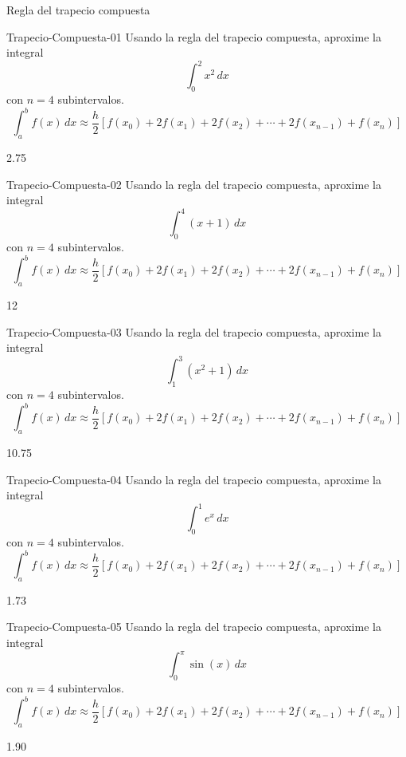 \documentclass[a4,11pt]{aleph-notas}
\begin{document}
\begin{quiz}{Regla del trapecio compuesta}
\begin{numerical}[tolerance=0.01]%
    {Trapecio-Compuesta-01}
    Usando la regla del trapecio compuesta, aproxime la integral
    \[
        \int_{0}^{2} x^2\,dx
    \]
    con \( n=4 \) subintervalos.
    \[
        \int_a^b f(x)\,dx \approx \frac{h}{2}\left[f(x_0)+2f(x_1)+2f(x_2)+\cdots+2f(x_{n-1})+f(x_n)\right]
    \]
    \item 2.75
\end{numerical}

\begin{numerical}[tolerance=0.01]%
    {Trapecio-Compuesta-02}
    Usando la regla del trapecio compuesta, aproxime la integral
    \[
        \int_{0}^{4} (x+1)\,dx
    \]
    con \( n=4 \) subintervalos.
    \[
        \int_a^b f(x)\,dx \approx \frac{h}{2}\left[f(x_0)+2f(x_1)+2f(x_2)+\cdots+2f(x_{n-1})+f(x_n)\right]
    \]
    \item 12
\end{numerical}

\begin{numerical}[tolerance=0.01]%
    {Trapecio-Compuesta-03}
    Usando la regla del trapecio compuesta, aproxime la integral
    \[
        \int_{1}^{3} (x^2+1)\,dx
    \]
    con \( n=4 \) subintervalos.
    \[
        \int_a^b f(x)\,dx \approx \frac{h}{2}\left[f(x_0)+2f(x_1)+2f(x_2)+\cdots+2f(x_{n-1})+f(x_n)\right]
    \]
    \item 10.75
\end{numerical}

\begin{numerical}[tolerance=0.01]%
    {Trapecio-Compuesta-04}
    Usando la regla del trapecio compuesta, aproxime la integral
    \[
        \int_{0}^{1} e^x\,dx
    \]
    con \( n=4 \) subintervalos.
    \[
        \int_a^b f(x)\,dx \approx \frac{h}{2}\left[f(x_0)+2f(x_1)+2f(x_2)+\cdots+2f(x_{n-1})+f(x_n)\right]
    \]
    \item 1.73
\end{numerical}

\begin{numerical}[tolerance=0.01]%
    {Trapecio-Compuesta-05}
    Usando la regla del trapecio compuesta, aproxime la integral
    \[
        \int_{0}^{\pi} \sin(x)\,dx
    \]
    con \( n=4 \) subintervalos.
    \[
        \int_a^b f(x)\,dx \approx \frac{h}{2}\left[f(x_0)+2f(x_1)+2f(x_2)+\cdots+2f(x_{n-1})+f(x_n)\right]
    \]
    \item 1.90
\end{numerical}

\end{quiz}

\end{document}
